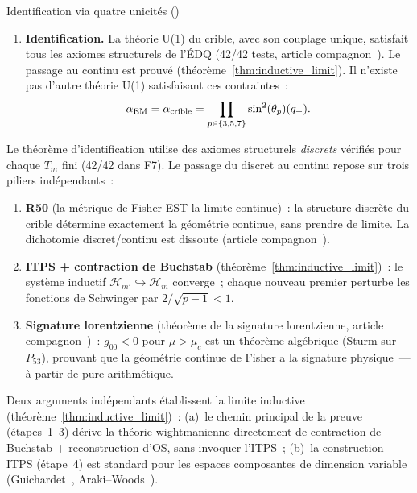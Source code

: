 \documentclass[12pt,a4paper]{article}
\begin{document}
\begin{thmbox}{Identification via quatre unicités (\BRIDGETAG)}
\begin{enumerate}[leftmargin=*, label=\textbf{(\roman*)}]
\item \textbf{Identification.}
  La théorie U(1) du crible, avec son couplage unique, satisfait
  tous les axiomes structurels de l'ÉDQ (42/42 tests, article
  compagnon~\cite{companion_physics}). Le passage au continu est
  prouvé (théorème~\ref{thm:inductive_limit}). Il n'existe pas
  d'autre théorie U(1) satisfaisant ces contraintes~:
  \begin{equation}
    \alpha_{\mathrm{EM}} = \alpha_{\rm crible} = \prod_{p \in \{3,5,7\}} \sin^2(\theta_{p})(q_{+}).
    \label{eq:identification}
  \end{equation}
\end{enumerate}
\end{thmbox}

\begin{remarque}\mBR
\label{rem:caveat_discrete}
Le théorème d'identification utilise des axiomes structurels
\emph{discrets} vérifiés pour chaque $T_m$ fini (42/42 dans F7).
Le passage du discret au continu repose sur trois piliers
indépendants~:
\begin{enumerate}[nosep]
\item \textbf{R50} (la métrique de Fisher EST la limite continue)~:
  la structure discrète du crible détermine exactement la géométrie
  continue, sans prendre de limite. La dichotomie
  discret/continu est dissoute (article
  compagnon~\cite{companion_physics}).
\item \textbf{ITPS + contraction de Buchstab}
  (théorème~\ref{thm:inductive_limit})~: le système inductif
  $\mathcal{H}_{m'} \hookrightarrow \mathcal{H}_m$ converge~;
  chaque nouveau premier perturbe les fonctions de Schwinger par
  $2/\!\sqrt{p-1} < 1$.
\item \textbf{Signature lorentzienne} (théorème de la signature
  lorentzienne, article compagnon~\cite{companion_physics})~:
  $g_{00} < 0$ pour $\mu > \mu_c$ est un théorème algébrique (Sturm
  sur $P_{53}$), prouvant que la géométrie continue de Fisher a la
  signature physique~--- à partir de pure arithmétique.
\end{enumerate}

\medskip\noindent
Deux arguments indépendants établissent la limite inductive
(théorème~\ref{thm:inductive_limit})~:
(a)~le chemin principal de la preuve (étapes~1--3) dérive la
théorie wightmanienne directement de contraction de Buchstab +
reconstruction d'OS, sans invoquer l'ITPS~;
(b)~la construction ITPS (étape~4) est standard pour les espaces
composantes de dimension variable
(Guichardet~\cite{Guichardet1966},
Araki--Woods~\cite{ArakiWoods1968}).
\end{remarque}
\end{document}
